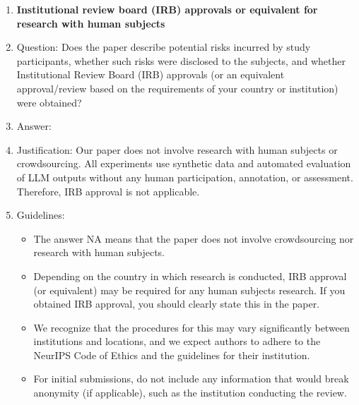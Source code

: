 \documentclass{article}
\begin{document}
\begin{enumerate}
\item {\bf Institutional review board (IRB) approvals or equivalent for research with human subjects}
    \item[] Question: Does the paper describe potential risks incurred by study participants, whether such risks were disclosed to the subjects, and whether Institutional Review Board (IRB) approvals (or an equivalent approval/review based on the requirements of your country or institution) were obtained?
    \item[] Answer: \answerNA{} %
    \item[] Justification: \justification Our paper does not involve research with human subjects or crowdsourcing. All experiments use synthetic data and automated evaluation of LLM outputs without any human participation, annotation, or assessment. Therefore, IRB approval is not applicable.{}
    \item[] Guidelines:
    \begin{itemize}
        \item The answer NA means that the paper does not involve crowdsourcing nor research with human subjects.
        \item Depending on the country in which research is conducted, IRB approval (or equivalent) may be required for any human subjects research. If you obtained IRB approval, you should clearly state this in the paper. 
        \item We recognize that the procedures for this may vary significantly between institutions and locations, and we expect authors to adhere to the NeurIPS Code of Ethics and the guidelines for their institution. 
        \item For initial submissions, do not include any information that would break anonymity (if applicable), such as the institution conducting the review.
    \end{itemize}


\end{enumerate}
\end{document}

